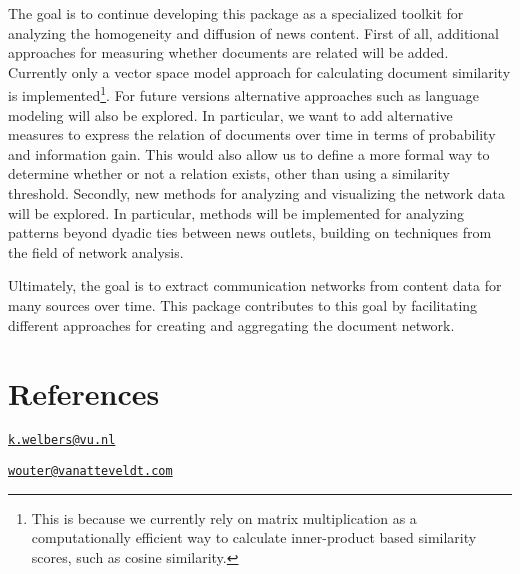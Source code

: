 The goal is to continue developing this package as a specialized toolkit
for analyzing the homogeneity and diffusion of news content. First of
all, additional approaches for measuring whether documents are related
will be added. Currently only a vector space model approach for
calculating document similarity is implemented\footnote{This is because
  we currently rely on matrix multiplication as a computationally
  efficient way to calculate inner-product based similarity scores, such
  as cosine similarity.}. For future versions alternative approaches
such as language modeling will also be explored. In particular, we want
to add alternative measures to express the relation of documents over
time in terms of probability and information gain. This would also allow
us to define a more formal way to determine whether or not a relation
exists, other than using a similarity threshold. Secondly, new methods
for analyzing and visualizing the network data will be explored. In
particular, methods will be implemented for analyzing patterns beyond
dyadic ties between news outlets, building on techniques from the field
of network analysis.

Ultimately, the goal is to extract communication networks from content
data for many sources over time. This package contributes to this goal
by facilitating different approaches for creating and aggregating the
document network.

\section{References}\label{references}



\address{
Kasper Welbers\\
VU University Amsterdam\\
De Boelelaan 1081,\\ 1081 HV Amsterdam, The Netherlands\\
}
\href{mailto:k.welbers@vu.nl}{\nolinkurl{k.welbers@vu.nl}}

\address{
Wouter van Atteveldt\\
VU University Amsterdam\\
De Boelelaan 1081,\\ 1081 HV Amsterdam, The Netherlands\\
}
\href{mailto:wouter@vanatteveldt.com}{\nolinkurl{wouter@vanatteveldt.com}}

